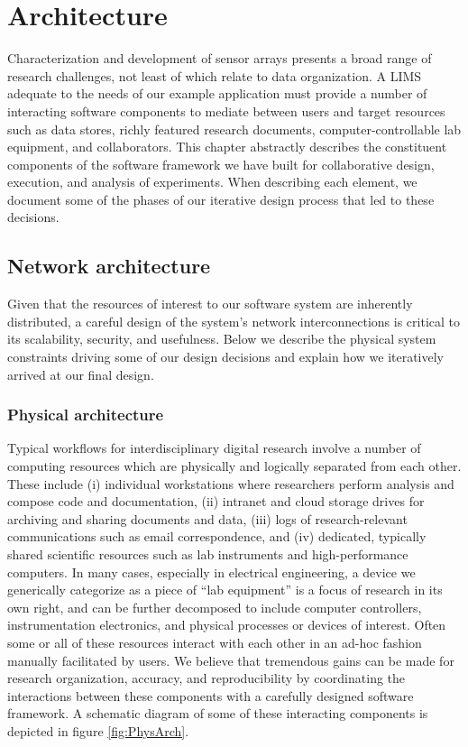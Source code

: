 \documentclass[../thesis]{subfiles}
\begin{document}
\chapter{Architecture}
Characterization and development of sensor arrays presents a broad
range of research challenges, not least of which relate to data
organization. A \gls{LIMS} adequate to the needs of our example
application must provide a number of interacting software components
to mediate between users and target resources such as data stores,
richly featured research documents, computer-controllable lab
equipment, and collaborators. This chapter abstractly describes the
constituent components of the software framework we have built for
collaborative design, execution, and analysis of experiments. When
describing each element, we document some of the phases of our
iterative design process that led to these decisions.

\section{Network architecture}
Given that the resources of interest to our software system are
inherently distributed, a careful design of the system's network
interconnections is critical to its scalability, security, and
usefulness. Below we describe the physical system constraints driving
some of our design decisions and explain how we iteratively arrived at
our final design.

\subsection{Physical architecture}
Typical workflows for interdisciplinary digital research involve a
number of computing resources which are physically and logically
separated from each other. These include (i) individual workstations
where researchers perform analysis and compose code and documentation,
(ii) intranet and cloud storage drives for archiving and sharing
documents and data, (iii) logs of research-relevant communications
such as email correspondence, and (iv) dedicated, typically shared
scientific resources such as lab instruments and high-performance
computers. In many cases, especially in electrical engineering, a
device we generically categorize as a piece of ``lab equipment'' is a
focus of research in its own right, and can be further decomposed to
include computer controllers, instrumentation electronics, and
physical processes or devices of interest. Often some or all of these
resources interact with each other in an ad-hoc fashion manually
facilitated by users. We believe that tremendous gains can be made for
research organization, accuracy, and reproducibility by coordinating
the interactions between these components with a carefully designed
software framework. A schematic diagram of some of these interacting
components is depicted in figure \ref{fig:PhysArch}.
\end{document}
